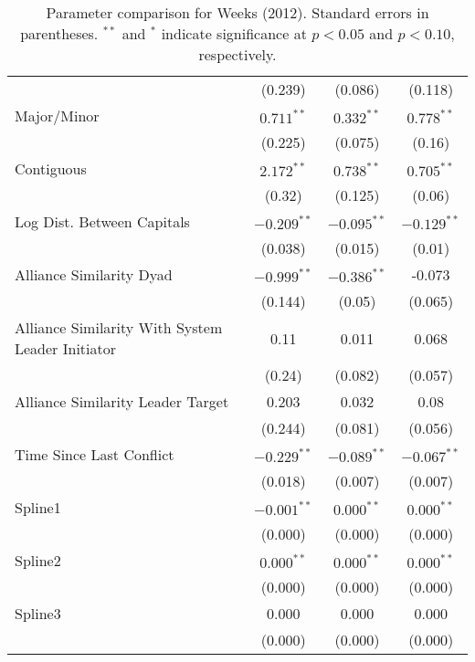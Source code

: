 \begin{table}[ht]
\begin{tabular}{lccc}
   & (0.239) & (0.086) & (0.118) \\ 
  Major/Minor & $0.711^{\ast\ast}$ & $0.332^{\ast\ast}$ & $0.778^{\ast\ast}$ \\ 
   & (0.225) & (0.075) & (0.16) \\ 
  Contiguous & $2.172^{\ast\ast}$ & $0.738^{\ast\ast}$ & $0.705^{\ast\ast}$ \\ 
   & (0.32) & (0.125) & (0.06) \\ 
  Log Dist. Between Capitals & $-0.209^{\ast\ast}$ & $-0.095^{\ast\ast}$ & $-0.129^{\ast\ast}$ \\ 
   & (0.038) & (0.015) & (0.01) \\ 
  Alliance Similarity Dyad  & $-0.999^{\ast\ast}$ & $-0.386^{\ast\ast}$ & -0.073 \\ 
   & (0.144) & (0.05) & (0.065) \\ 
  Alliance Similarity With System Leader Initiator & 0.11 & 0.011 & 0.068 \\ 
   & (0.24) & (0.082) & (0.057) \\ 
  Alliance Similarity Leader Target & 0.203 & 0.032 & 0.08 \\ 
   & (0.244) & (0.081) & (0.056) \\ 
  Time Since Last Conflict & $-0.229^{\ast\ast}$ & $-0.089^{\ast\ast}$ & $-0.067^{\ast\ast}$ \\ 
   & (0.018) & (0.007) & (0.007) \\ 
  Spline1 & $-0.001^{\ast\ast}$ & $0.000^{\ast\ast}$ & $0.000^{\ast\ast}$ \\ 
   & (0.000) & (0.000) & (0.000) \\ 
  Spline2 & $0.000^{\ast\ast}$ & $0.000^{\ast\ast}$ & $0.000^{\ast\ast}$ \\ 
   & (0.000) & (0.000) & (0.000) \\ 
  Spline3 & 0.000 & 0.000 & 0.000 \\ 
   & (0.000) & (0.000) & (0.000) \\ 
   \hline
\hline
\end{tabular}
\endgroup
\caption{Parameter comparison for Weeks (2012). Standard errors in parentheses. $^{**}$ and $^{*}$ indicate significance at $p<0.05$ and $p<0.10$, respectively.} 
\label{tab:weeks_coef}
\end{table}